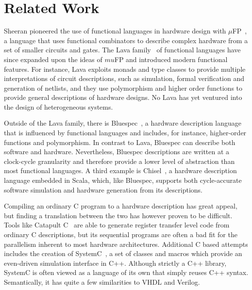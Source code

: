 \documentclass[../paper.tex]{subfiles}
\begin{document}
\section{Related Work}
\label{related}

Sheeran pioneered the use of functional languages in hardware design with $\mu$FP~\cite{sheeran1984}, a language that uses functional combinators to describe complex hardware from a set of smaller circuits and gates. The Lava family~\cite{bjesse1998, gill2010, york-lava} of functional languages have since expanded upon the ideas of $mu$FP and introduced modern functional features. For instance, Lava exploits monads and type classes to provide multiple interpretations of circuit descriptions, such as simulation, formal verification and generation of netlists, and they use polymorphism and higher order functions to provide general descriptions of hardware designs. No Lava has yet ventured into the design of heterogeneous systems.


Outside of the Lava family, there is Bluespec~\cite{nikhil2004}, a hardware description language that is influenced by functional languages and includes, for instance, higher-order functions and polymorphism. In contrast to Lava, Bluespec can describe both software and hardware. Nevertheless, Bluespec descriptions are written at a clock-cycle granularity and therefore provide a lower level of abstraction than most functional languages. A third example is Chisel~\cite{bachrach2012}, a hardware description language embedded in Scala, which, like Bluespec, supports both cycle-accurate software simulation and hardware generation from its descriptions.

Compiling an ordinary C program to a hardware description has great appeal, but finding a translation between the two has however proven to be difficult. Tools like Catapult C~\cite{graphics2008} are able to generate register transfer level code from ordinary C descriptions, but its sequential programs are often a bad fit for the parallelism inherent to most hardware architectures. Additional C based attempts includes the creation of SystemC~\cite{ghenassia2005}, a set of classes and macros which provide an even-driven simulation interface in C++. Although strictly a C++ library, SystemC is often viewed as a language of its own that simply reuses C++ syntax. Semantically, it has quite a few similarities to VHDL and Verilog.
\end{document}
